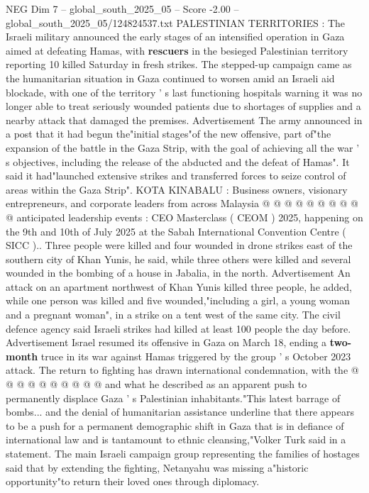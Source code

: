 \begin{textsample}{NEG Dim 7 – global\_south\_2025\_05 – Score -2.00 – global\_south\_2025\_05/124824537.txt}  \label{ex:f7_neg_012}
PALESTINIAN TERRITORIES : The Israeli military announced the early stages of an intensified operation in Gaza aimed at defeating Hamas, with \textbf{rescuers} in the besieged Palestinian territory reporting 10 killed Saturday in fresh strikes.
The stepped-up campaign came as the humanitarian situation in Gaza continued to worsen amid an Israeli aid blockade, with one of the territory ' s last functioning hospitals warning it was no longer able to treat seriously wounded patients due to shortages of supplies and a nearby attack that damaged the premises.
Advertisement The army announced in a post that it had begun the"initial stages"of the new offensive, part of"the expansion of the battle in the Gaza Strip, with the goal of achieving all the war ' s objectives, including the release of the abducted and the defeat of Hamas".
It said it had"launched extensive strikes and transferred forces to seize control of areas within the Gaza Strip".
KOTA KINABALU : Business owners, visionary entrepreneurs, and corporate leaders from across Malaysia @ @ @ @ @ @ @ @ @ @ anticipated leadership events : CEO Masterclass ( CEOM ) 2025, happening on the 9th and 10th of July 2025 at the Sabah International Convention Centre ( SICC )..
Three people were killed and four wounded in drone strikes east of the southern city of Khan Yunis, he said, while three others were killed and several wounded in the bombing of a house in Jabalia, in the north.
Advertisement An attack on an apartment northwest of Khan Yunis killed three people, he added, while one person was killed and five wounded,"including a girl, a young woman and a pregnant woman", in a strike on a tent west of the same city.
The civil defence agency said Israeli strikes had killed at least 100 people the day before.
Advertisement Israel resumed its offensive in Gaza on March 18, ending a \textbf{two-month} truce in its war against Hamas triggered by the group ' s October 2023 attack.
The return to fighting has drawn international condemnation, with the @ @ @ @ @ @ @ @ @ @ and what he described as an apparent push to permanently displace Gaza ' s Palestinian inhabitants."This latest barrage of bombs... and the denial of humanitarian assistance underline that there appears to be a push for a permanent demographic shift in Gaza that is in defiance of international law and is tantamount to ethnic cleansing,"Volker Turk said in a statement.
The main Israeli campaign group representing the families of hostages said that by extending the fighting, Netanyahu was missing a"historic opportunity"to return their loved ones through diplomacy.

\end{textsample}
